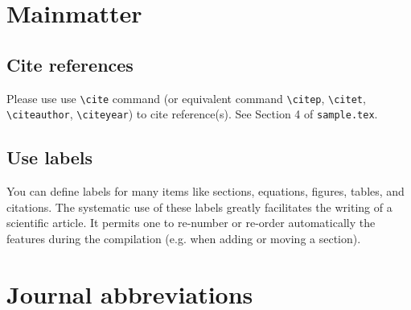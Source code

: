 \documentclass{aastex}
\begin{document}
\section{Mainmatter}

\subsection{Cite references}\label{ss:cr}

Please use  use \verb!\cite! command (or equivalent command 
\verb!\citep!, 
\verb!\citet!,
\verb!\citeauthor!, 
\verb!\citeyear!)
to cite reference(s). See Section 4 of \verb!sample.tex!.
 

\subsection{Use labels}\label{ss:ul}
You can define labels for many items like sections, equations, figures, tables, and
citations. The systematic use of these labels greatly facilitates the writing of a scientific
article. It permits one to re-number or re-order automatically the
features during the compilation 
(e.g. when adding or moving a section). 


\section{Journal abbreviations}\label{s:ja}
\end{document}

